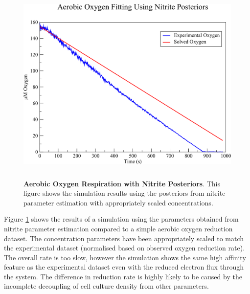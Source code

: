 \begin{figure}[tbp]
 \centering
 \includegraphics[height=10cm]{./07-nitritereduction/data/oxygen_dataset.pdf}
 \caption[Aerobic Oxygen Respiration with Nitrite Posteriors]{{\bf Aerobic Oxygen Respiration with Nitrite Posteriors}. This figure shows the simulation results using the posteriors from nitrite parameter estimation with appropriately scaled concentrations.
 \label{fig:oxygen_simulation}}
\end{figure}

Figure \ref{fig:oxygen_simulation} shows the results of a simulation using the parameters obtained from nitrite parameter estimation compared to a simple aerobic oxygen reduction dataset. The concentration parameters have been appropriately scaled to match the experimental dataset (normalised based on observed oxygen reduction rate). The overall rate is too slow, however the simulation shows the same high affinity feature as the experimental dataset even with the reduced electron flux through the system. The difference in reduction rate is highly likely to be caused by the incomplete decoupling of cell culture density from other parameters.

